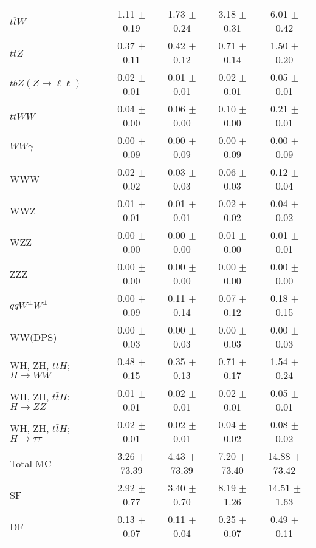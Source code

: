 \begin{tabular}{l|cccc}
                   $t\overline{t}W$ &  1.11 $\pm$  0.19 &  1.73 $\pm$  0.24 &  3.18 $\pm$  0.31 &  6.01 $\pm$  0.42 \\
                   $t\overline{t}Z$ &  0.37 $\pm$  0.11 &  0.42 $\pm$  0.12 &  0.71 $\pm$  0.14 &  1.50 $\pm$  0.20 \\
    $tbZ (Z \rightarrow \ell \ell)$ &  0.02 $\pm$  0.01 &  0.01 $\pm$  0.01 &  0.02 $\pm$  0.01 &  0.05 $\pm$  0.01 \\
                  $t\overline{t}WW$ &  0.04 $\pm$  0.00 &  0.06 $\pm$  0.00 &  0.10 $\pm$  0.00 &  0.21 $\pm$  0.01 \\
                         $WW\gamma$ &  0.00 $\pm$  0.09 &  0.00 $\pm$  0.09 &  0.00 $\pm$  0.09 &  0.00 $\pm$  0.09 \\
                                WWW &  0.02 $\pm$  0.02 &  0.03 $\pm$  0.03 &  0.06 $\pm$  0.03 &  0.12 $\pm$  0.04 \\
                                WWZ &  0.01 $\pm$  0.01 &  0.01 $\pm$  0.01 &  0.02 $\pm$  0.02 &  0.04 $\pm$  0.02 \\
                                WZZ &  0.00 $\pm$  0.00 &  0.00 $\pm$  0.00 &  0.01 $\pm$  0.00 &  0.01 $\pm$  0.01 \\
                                ZZZ &  0.00 $\pm$  0.00 &  0.00 $\pm$  0.00 &  0.00 $\pm$  0.00 &  0.00 $\pm$  0.00 \\
                 $qqW^{\pm}W^{\pm}$ &  0.00 $\pm$  0.09 &  0.11 $\pm$  0.14 &  0.07 $\pm$  0.12 &  0.18 $\pm$  0.15 \\
                            WW(DPS) &  0.00 $\pm$  0.03 &  0.00 $\pm$  0.03 &  0.00 $\pm$  0.03 &  0.00 $\pm$  0.03 \\
WH, ZH, $t\bar{t}H$; $H \rightarrow WW$ &  0.48 $\pm$  0.15 &  0.35 $\pm$  0.13 &  0.71 $\pm$  0.17 &  1.54 $\pm$  0.24 \\
WH, ZH, $t\bar{t}H$; $H \rightarrow ZZ$ &  0.01 $\pm$  0.01 &  0.02 $\pm$  0.01 &  0.02 $\pm$  0.01 &  0.05 $\pm$  0.01 \\
WH, ZH, $t\bar{t}H$; $H \rightarrow \tau\tau$ &  0.02 $\pm$  0.01 &  0.02 $\pm$  0.01 &  0.04 $\pm$  0.02 &  0.08 $\pm$  0.02 \\
\hline\hline
                           Total MC &  3.26 $\pm$ 73.39 &  4.43 $\pm$ 73.39 &  7.20 $\pm$ 73.40 & 14.88 $\pm$ 73.42 \\
\hline
                                 SF &  2.92 $\pm$  0.77 &  3.40 $\pm$  0.70 &  8.19 $\pm$  1.26 & 14.51 $\pm$  1.63 \\
                                 DF &  0.13 $\pm$  0.07 &  0.11 $\pm$  0.04 &  0.25 $\pm$  0.07 &  0.49 $\pm$  0.11 \\

\end{tabular}
